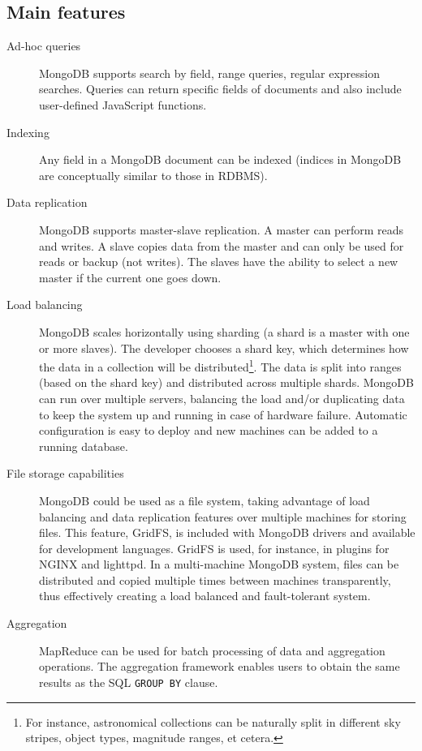 \subsection{Main features} \label{features_mongo}

\begin{description} %

\item[Ad-hoc queries] %
MongoDB supports search by field, range queries, regular expression searches. Queries can return specific fields of documents and also include user-defined JavaScript functions.

\item[Indexing] %
Any field in a MongoDB document can be indexed (indices in MongoDB are conceptually similar to those in RDBMS).

\item[Data replication] %
MongoDB supports master-slave replication. A master can perform reads and writes. A slave copies data from the master and can only be used for reads or backup (not writes). The slaves have the ability to select a new master if the current one goes down.

\item[Load balancing] %
MongoDB scales horizontally using sharding (a shard is a master with one or more slaves). The developer chooses a shard key, which determines how the data in a collection will be
distributed\footnote{For instance, astronomical collections can be naturally split in different sky stripes, object types, magnitude ranges, et cetera.}. %
The data is split into ranges (based on the shard key) and distributed across multiple shards. MongoDB can run over multiple servers, balancing the load and/or duplicating data to keep the system up and running in case of hardware failure. Automatic configuration is easy to deploy and new machines can be added to a running database.

\item[File storage capabilities] %

MongoDB could be used as a file system, taking advantage of load balancing and data replication features over multiple machines for storing files. This feature, GridFS, is included with MongoDB drivers and available for development languages. GridFS is used, for instance, in plugins for NGINX and lighttpd. In a multi-machine MongoDB system, files can be distributed and copied multiple times between machines transparently, thus effectively creating a load balanced and
fault-tolerant %
system.

\item[Aggregation] %
MapReduce can be used for batch processing of data and aggregation operations. The aggregation framework enables users to obtain the same results as the SQL
\texttt{GROUP BY}
clause.

\end{description} %

